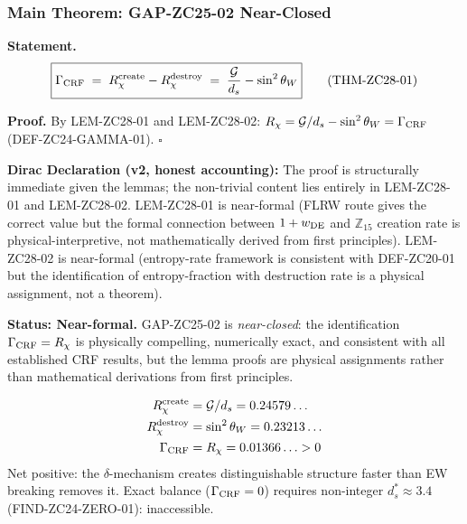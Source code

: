 \documentclass[12pt, a4paper]{article}
\begin{document}
\subsubsection{Main Theorem: GAP-ZC25-02 Near-Closed}

\begin{formalbox}[title={THM-ZC28-01: $\Gamma_{\rm CRF} = R_\chi$
  ~~(Near-Formal --- Dirac Declaration)}]
\textbf{Statement.}
\begin{equation}
  \boxed{
  \Gamma_{\rm CRF}
  \;=\;
  R_\chi^{\rm create} - R_\chi^{\rm destroy}
  \;=\;
  \frac{\mathcal{G}}{d_s} - \sin^2\theta_W
  }
  \tag{THM-ZC28-01}
\end{equation}

\textbf{Proof.}
By LEM-ZC28-01 and LEM-ZC28-02:
$R_\chi = \mathcal{G}/d_s - \sin^2\theta_W = \Gamma_{\rm CRF}$
(DEF-ZC24-GAMMA-01).
\hfill$\square$

\medskip
\textbf{Dirac Declaration (v2, honest accounting):}
The proof is structurally immediate given the lemmas;
the non-trivial content lies entirely in LEM-ZC28-01 and
LEM-ZC28-02. LEM-ZC28-01 is near-formal (FLRW route
gives the correct value but the formal connection between
$1+w_{\rm DE}$ and $\mathbb{Z}_{15}$ creation rate is
physical-interpretive, not mathematically derived from
first principles). LEM-ZC28-02 is near-formal (entropy-rate
framework is consistent with DEF-ZC20-01 but the identification
of entropy-fraction with destruction rate is a physical
assignment, not a theorem).

\medskip
\textbf{Status: Near-formal.}
GAP-ZC25-02 is \emph{near-closed}: the identification
$\Gamma_{\rm CRF} = R_\chi$ is physically compelling,
numerically exact, and consistent with all established CRF
results, but the lemma proofs are physical assignments rather
than mathematical derivations from first principles.
\end{formalbox}

\begin{derivedbox}[title={FIND-ZC28-02: $\Gamma_{\rm CRF} > 0$
  Means Net Order Creation (unchanged)}]
\begin{align}
  R_\chi^{\rm create} &= \mathcal{G}/d_s = 0.24579\ldots \\
  R_\chi^{\rm destroy} &= \sin^2\theta_W = 0.23213\ldots \\
  \Gamma_{\rm CRF} &= R_\chi = 0.01366\ldots > 0
\end{align}
Net positive: the $\delta$-mechanism creates distinguishable
structure faster than EW breaking removes it.
Exact balance ($\Gamma_{\rm CRF} = 0$) requires non-integer
$d_s^* \approx 3.4$ (FIND-ZC24-ZERO-01): inaccessible.
\end{derivedbox}
\end{document}
